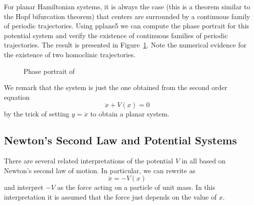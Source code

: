 \documentclass{ximera}
\begin{document}
For planar Hamiltonian systems, it is always the case (this is a theorem
similar to the Hopf bifurcation theorem) that centers are surrounded by 
a continuous family of periodic 
trajectories.  Using 
{\sf pplane5} we can
compute the phase portrait for 
this potential system and verify the 
existence of continuous families of periodic trajectories.  The result 
is presented in Figure~\ref{F:hamex}.  Note the numerical evidence for 
the existence of two homoclinic trajectories.  
\begin{figure}[htb]
           \centerline{%
	   }
           \caption{Phase portrait of \protect{}}
           \label{F:hamex}
\end{figure}

We remark that the system  is just the one obtained from the 
second order equation 
\begin{equation}  \label{e:V(x)}
\ddot{x} + V(x) = 0
\end{equation}
by the trick of setting $y=\dot{x}$ to obtain a planar system. 

\subsection*{Newton's Second Law and Potential Systems}

There are several related interpretations of the potential $V$ in
 all based on Newton's second law of motion. 
  In particular, we can rewrite  as 
\[
\ddot{x} =  -V(x)
\]
and interpret $-V$ as the force acting on a 
particle of unit mass.  In this 
interpretation it is assumed that the force just depends on the value of $x$. 
\end{document}
